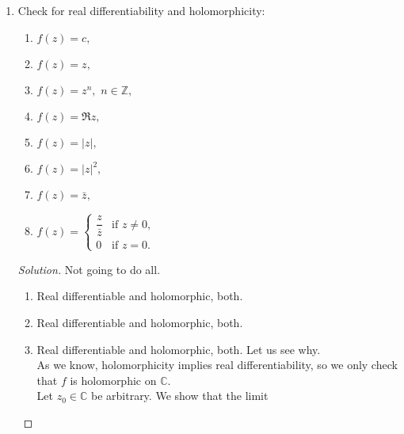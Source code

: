 \documentclass[12pt]{article}
\theoremstyle{definition}
\numberwithin{thm}{section}
\newenvironment{soln}{\begin{proof}[Solution]}{\end{proof}}
\begin{document}
\begin{enumerate}
\begin{soln}
\begin{equation*}
\begin{cases}
			\end{cases}
		\end{equation*}	
		where $\gamma:[s, t] \to B$ is the path which is the arc joining $\sigma(s)$ to $\sigma(t).$ (Note that $\sigma(s) = \sigma(t)$ is possible in which case, it's the constant path.)\\
		Clearly, $\sigma'$ avoids $w$ and is continuous. \hfill (Why?)\\~\\
		Moreover, $\sigma'(0) = \sigma(0) = z_0$ and $\sigma'(1) = \sigma(1) = z_1$ and thus, $\sigma'$ is a path from $z_0$ to $z_1$ in $U \setminus \{w\},$ showing that $U\setminus\{w\}$ is path-connected.
	\end{soln}
	\item Check for real differentiability and holomorphicity:
	\begin{enumerate}
		\item $f(z) = c,$
		\item $f(z) = z,$
		\item $f(z) = z^n,$ $n \in \mathbb{Z},$
		\item $f(z) = \Re z,$
		\item $f(z) = \left|z\right|,$
		\item $f(z) = \left|z\right|^2,$
		\item $f(z) = \bar{z},$
		\item $f(z) = \begin{cases}
		\dfrac{z}{\bar{z}} & \text{if } z \neq 0,\\
		0 & \text{if } z = 0.
		\end{cases}$
	\end{enumerate}
	\begin{soln}
		Not going to do all.
		\begin{enumerate}
			\item Real differentiable and holomorphic, both.
			\item Real differentiable and holomorphic, both.
			\item Real differentiable and holomorphic, both. Let us see why.\\
			As we know, holomorphicity implies real differentiability, so we only check that $f$ is holomorphic on $\mathbb{C}.$\\
			Let $z_0 \in \mathbb{C}$ be arbitrary. We show that the limit
			\begin{equation*} 

\end{equation*}
\end{enumerate}
\end{soln}
\end{enumerate}
\end{document}
